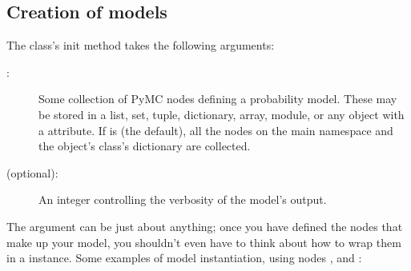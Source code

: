 \subsection*{Creation of models} \label{sec:ModelInstantiation}
The  class's init method takes the following arguments:
\begin{description}
    \item[:] Some collection of PyMC nodes defining a probability model. These may be stored in a list, set, tuple, dictionary, array, module, or any object with a  attribute. If  is  (the default), all the nodes on the main namespace and the  object's class's dictionary are collected.
    \item[ (optional):] An integer controlling the verbosity of the model's output.
\end{description}
The  argument can be just about anything; once you have defined the nodes that make up your model, you shouldn't even have to think about how to wrap them in a  instance. Some examples of model instantiation, using nodes ,  and :

